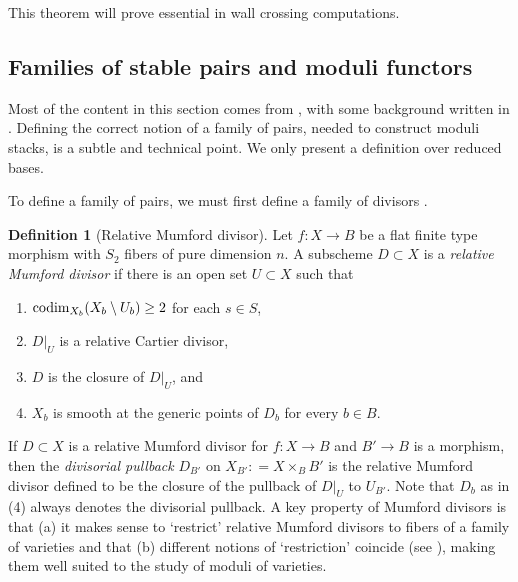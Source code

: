 \documentclass[11pt]{amsart}
\numberwithin{equation}{section}
\theoremstyle{definition}
\newtheorem{defn}[theorem]{Definition}
\begin{document}
This theorem will prove essential in wall crossing computations.




\subsection{Families of stable pairs and moduli functors}

Most of the content in this section comes from \cite{KolNewBook}, with some background written in \cite{BABWILD}.  Defining the correct notion of a family of pairs, needed to construct moduli stacks, is a subtle and technical point.  We only present a definition over reduced bases. 


To define a family of pairs, we must first define a family of divisors \cite[Definition 4.68]{KolNewBook}. 

\begin{defn}[Relative Mumford divisor]
Let $f:X\to B$ be a flat finite type morphism with $S_2$ fibers of pure dimension $n$. 
A subscheme $D\subset X$ is a \emph{relative Mumford divisor} if there is an open set $U\subset X$ such that 
\begin{enumerate}
\item ${\rm codim}_{X_b}(X_b\setminus U_b) \geq 2$ for each $s\in S$, 
\item $D\vert_U$ is a relative Cartier divisor,
\item $D$ is the closure of $D\vert_U$, and
\item $X_b$ is smooth at the generic points of $D_b$ for every $b\in B$.
\end{enumerate}
\end{defn}
	
If $D\subset X$ is a relative Mumford divisor for $f:X\to B$ and $B'\to B$ is a morphism, then the \emph{divisorial pullback} $D_{B'}$  on $X_{B'}: = X\times_B B'$ is the relative Mumford divisor defined to be the closure of the pullback of $D\vert_U$ to $U_{B'}$. Note that $D_b$ as in (4) always denotes the divisorial pullback.  A key property of Mumford divisors is that (a) it makes sense to `restrict' relative Mumford divisors to fibers of a family of varieties and that (b) different notions of `restriction' coincide (see \cite[Proposition 2.79]{KolNewBook}), making them well suited to the study of moduli of varieties. 
\end{document}
